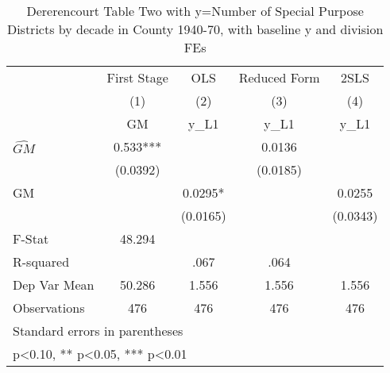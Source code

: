 \begin{table}[htbp]\centering
\def\sym#1{\ifmmode^{#1}\else\(^{#1}\)\fi}
\caption{Dererencourt Table Two with y=Number of Special Purpose Districts by decade in County 1940-70, with baseline y and division FEs}
\begin{tabular}{l*{4}{c}}
\toprule
                    & First Stage   &         OLS   &Reduced Form   &        2SLS   \\
                    &\multicolumn{1}{c}{(1)}&\multicolumn{1}{c}{(2)}&\multicolumn{1}{c}{(3)}&\multicolumn{1}{c}{(4)}\\
                    &\multicolumn{1}{c}{GM}&\multicolumn{1}{c}{y\_L1}&\multicolumn{1}{c}{y\_L1}&\multicolumn{1}{c}{y\_L1}\\
\midrule
$\hat{GM}$          &       0.533***&               &      0.0136   &               \\
                    &    (0.0392)   &               &    (0.0185)   &               \\
\addlinespace
GM                  &               &      0.0295*  &               &      0.0255   \\
                    &               &    (0.0165)   &               &    (0.0343)   \\
\midrule
F-Stat              &      48.294   &               &               &               \\
R-squared           &               &        .067   &        .064   &               \\
Dep Var Mean        &      50.286   &       1.556   &       1.556   &       1.556   \\
Observations        &         476   &         476   &         476   &         476   \\
\bottomrule
\multicolumn{5}{l}{\footnotesize Standard errors in parentheses}\\
\multicolumn{5}{l}{\footnotesize * p<0.10, ** p<0.05, *** p<0.01}\\
\end{tabular}
\end{table}
